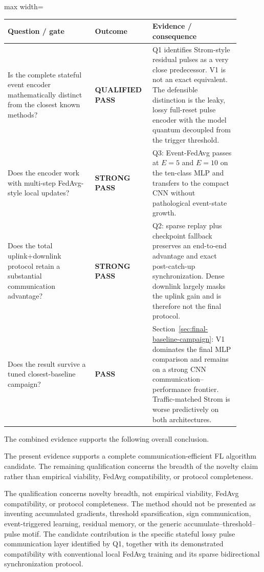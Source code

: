 \begin{center}
\begin{adjustbox}{max width=\textwidth}
\begin{tabular}{p{0.35\linewidth}p{0.20\linewidth}p{0.35\linewidth}}
\toprule
Question / gate & Outcome & Evidence / consequence\\
\midrule
Is the complete stateful event encoder mathematically distinct from the closest known methods? & \textbf{QUALIFIED PASS} & Q1 identifies Strom-style residual pulses as a very close predecessor. V1 is not an exact equivalent. The defensible distinction is the leaky, lossy full-reset pulse encoder with the model quantum decoupled from the trigger threshold.\\
Does the encoder work with multi-step FedAvg-style local updates? & \textbf{STRONG PASS} & Q3: Event-FedAvg passes at $E=5$ and $E=10$ on the ten-class MLP and transfers to the compact CNN without pathological event-state growth.\\
Does the total uplink+downlink protocol retain a substantial communication advantage? & \textbf{STRONG PASS} & Q2: sparse replay plus checkpoint fallback preserves an end-to-end advantage and exact post-catch-up synchronization. Dense downlink largely masks the uplink gain and is therefore not the final protocol.\\
Does the result survive a tuned closest-baseline campaign? & \textbf{PASS} & Section~\ref{sec:final-baseline-campaign}: V1 dominates the final MLP comparison and remains on a strong CNN communication--performance frontier. Traffic-matched Strom is worse predictively on both architectures.\\
\bottomrule
\end{tabular}
\end{adjustbox}
\end{center}

The combined evidence supports the following overall conclusion.
\begin{takeawaybox}[title={Consolidated algorithm decision}]
The present evidence supports a complete communication-efficient FL algorithm candidate. The remaining qualification concerns the breadth of the novelty claim rather than empirical viability, FedAvg compatibility, or protocol completeness.
\end{takeawaybox}
The qualification concerns novelty breadth, not empirical viability, FedAvg compatibility, or protocol completeness. The method should not be presented as inventing accumulated gradients, threshold sparsification, sign communication, event-triggered learning, residual memory, or the generic accumulate--threshold--pulse motif. The candidate contribution is the specific stateful lossy pulse communication layer identified by Q1, together with its demonstrated compatibility with conventional local FedAvg training and its sparse bidirectional synchronization protocol.

